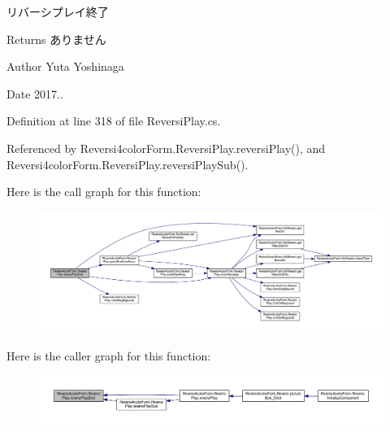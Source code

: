 リバーシプレイ終了 

\begin{DoxyReturn}{Returns}
ありません 
\end{DoxyReturn}
\begin{DoxyAuthor}{Author}
Yuta Yoshinaga 
\end{DoxyAuthor}
\begin{DoxyDate}{Date}
2017.. 
\end{DoxyDate}


Definition at line 318 of file Reversi\+Play.\+cs.



Referenced by Reversi4color\+Form.\+Reversi\+Play.\+reversi\+Play(), and Reversi4color\+Form.\+Reversi\+Play.\+reversi\+Play\+Sub().

Here is the call graph for this function\+:\nopagebreak
\begin{figure}[H]
\begin{center}
\leavevmode
\includegraphics[width=350pt]{class_reversi4color_form_1_1_reversi_play_a79053272ed2b985de79154b105c46c15_cgraph}
\end{center}
\end{figure}
Here is the caller graph for this function\+:\nopagebreak
\begin{figure}[H]
\begin{center}
\leavevmode
\includegraphics[width=350pt]{class_reversi4color_form_1_1_reversi_play_a79053272ed2b985de79154b105c46c15_icgraph}
\end{center}
\end{figure}
\mbox{\label{class_reversi4color_form_1_1_reversi_play_a47c3f277e5f480d6a5af1ca7b3a667f4}} 
